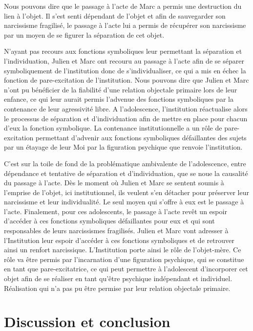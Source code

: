 \documentclass[12pt, a4paper]{book}
\begin{document}
\begin{spacing}{1.5}
Nous pouvons dire que le passage à l'acte de Marc a permis une destruction du lien à l'objet. Il s'est senti dépendant de l'objet et afin de sauvegarder son narcissisme fragilisé, le passage à l'acte lui a permis de récupérer son narcissisme par un moyen de se figurer la séparation de cet objet.

N'ayant pas recours aux fonctions symboliques leur permettant la séparation et l'individuation, Julien et Marc ont recouru au passage à l'acte afin de se séparer symboliquement de l'institution donc de s'individualiser, ce qui a mis en échec la fonction de pare-excitation de l'institution. Nous pouvons dire que Julien et Marc n'ont pu bénéficier de la fiabilité d'une relation objectale primaire lors de leur  enfance, ce qui leur aurait permis l'advenue des fonctions symboliques par la contenance de leur agressivité libre.  A l'adolescence,  l'institution   réactualise alors le processus de séparation et d'individuation afin de mettre en place pour chacun d'eux la fonction  symbolique. La contenance institutionnelle a un rôle de pare-excitation  permettant d'advenir aux fonctions symboliques défaillantes des sujets par un étayage de leur Moi par la figuration psychique que renvoie l'institution. 

C'est sur la toile de fond de la problématique ambivalente de l'adolescence, entre dépendance et tentative de séparation et d'individuation, que se noue la causalité du passage à l'acte. Dès le moment où Julien et Marc se sentent soumis à l'emprise de l'objet, ici institutionnel, ils veulent s'en détacher pour préserver leur narcissisme et leur individualité. Le seul moyen qui s'offre à eux est le passage à l'acte. Finalement, pour ces adolescents, le passage à l'acte revêt un espoir d'accéder à ces fonctions symboliques défaillantes pour eux et qui sont responsables de leurs narcissismes fragilisés. Julien et Marc vont adresser à l'Institution leur espoir d'accéder à ces fonctions symboliques et de retrouver ainsi un renfort narcissique. L'Institution porte ainsi le rôle de l'objet-mère. Ce rôle va être permis par l'incarnation d'une figuration psychique, qui se constitue en tant que pare-excitatrice, ce qui peut permettre à l'adolescent d'incorporer cet objet afin de se réaliser en tant qu'être psychique indépendant et individuel. Réalisation qui n'a pas pu être permise par leur relation objectale primaire.

\chapter{Discussion et conclusion}


\end{spacing}
\end{document}
